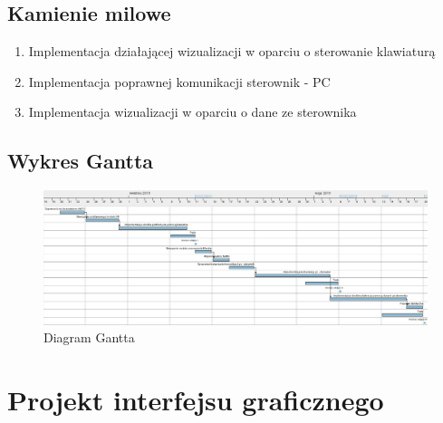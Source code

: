 \documentclass[10pt, a4paper]{article}
\begin{document}
	\subsection{Kamienie milowe}
		\begin{enumerate}
			\item Implementacja działającej wizualizacji w oparciu o sterowanie klawiaturą
			\item Implementacja poprawnej komunikacji sterownik - PC
			\item Implementacja wizualizacji w oparciu o dane ze sterownika
		\end{enumerate}
	
	\subsection{Wykres Gantta}
	
	\begin{figure}[H]
		\centering
		\includegraphics[width=1.4\textwidth, angle = 90]{figures/harm1.png}
		\caption{Diagram Gantta}
		\label{fig:DiagramGantta}
	\end{figure}

\section{Projekt interfejsu graficznego}
\end{document}
